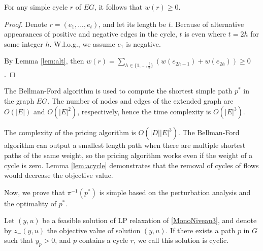 \begin{corollary}
For  any simple cycle  \(r\) of \(EG\), it follows that \(w(r) \ge 0\).
\end{corollary}
\begin{proof}
Denote \(r=(e_1,...,e_t)\),  and let its length be \(t\). Because of alternative appearances of positive and negative edges in the cycle, \(t\) is even where \(t = 2h\) for some integer \(h\). W.l.o.g., we assume \(e_1\) is negative.

By Lemma \eqref{lem:alt}, then \(w(r) = \sum_{h \in \{1,\hdots,\frac{t}{2}\}}\left(w(e_{2h-1}) + w(e_{2h})\right) \ge 0\).
\end{proof}

The Bellman-Ford algorithm is used to compute the shortest simple path \(p^{\ast}\) in the graph \(EG\). The number of nodes and edges of the extended graph are \(O(|E|)\) and \(O(|E|^2)\), respectively, hence the time complexity is \(O(|E|^3)\).

The complexity of the pricing algorithm is \(O(|D||E|^3)\). The Bellman-Ford algorithm can output a smallest length path when there are multiple shortest paths of the same weight, so the pricing algorithm works even if the weight of a cycle is zero. Lemma \ref{lem:acycle} demonstrates that the removal of cycles of flows would decrease the objective value.

Now, we prove that \(\pi^{-1}(p^{\ast})\) is simple based on the perturbation analysis and the optimality of \(p^{\ast}\).



Let \((y, u)\) be a feasible solution of LP relaxation of \eqref{MonoNiveau3}, and denote  by \(z_{-}(y,u)\) the objective value of solution \((y,u)\).
If there exists a path \(p\) in \(G\) such that \(y_p > 0\), and \(p\) contains a cycle \(r\), we call this solution is cyclic.

